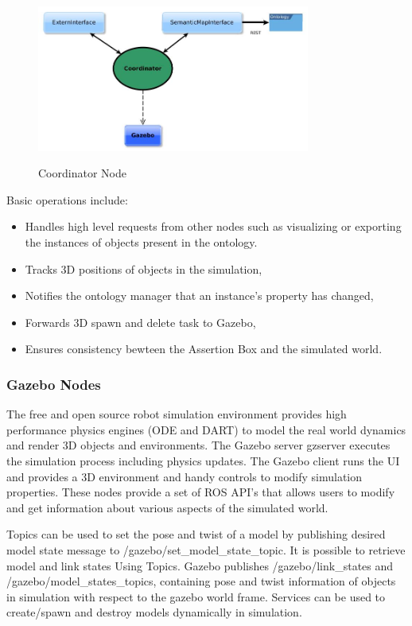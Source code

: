 \begin{figure}[H]
\centering
\includegraphics[width=0.8\textwidth]{imgs/coordinator.jpg}
\label{fig:actions}
\caption{Coordinator Node}
\end{figure}

Basic operations include:

\begin{itemize}
\item Handles high level requests from other nodes such as visualizing or exporting the instances of objects present in the ontology.
\item Tracks 3D positions of objects in the simulation,
\item Notifies the ontology manager that an instance's property has changed,
\item Forwards 3D spawn and delete task to Gazebo,
\item Ensures consistency bewteen the Assertion Box and the simulated world.
\end{itemize}

\subsubsection{Gazebo Nodes}

The free and open source robot simulation environment provides high performance physics engines (ODE and DART) to model the real world dynamics and render 3D objects and environments. The Gazebo server gzserver executes the simulation process including physics updates. The Gazebo client runs the UI and provides a 3D environment and handy controls to modify simulation properties. These nodes provide a set of ROS API's that allows users to modify and get information about various aspects of the simulated world.


Topics can be used to set the pose and twist of a model by publishing desired model state message to /gazebo/set\_model\_state\_topic. It is possible to retrieve model and link states Using Topics. Gazebo publishes /gazebo/link\_states and /gazebo/model\_states\_topics, containing pose and twist information of objects in simulation with respect to the gazebo world frame. Services can be used to create/spawn and destroy models dynamically in simulation.

